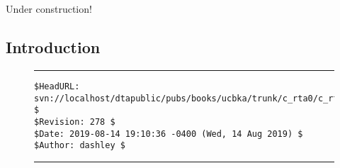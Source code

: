 
\chapter{\crtazerolongtitle{}}

\label{crta0}

                     {Under construction!}

\section{Introduction}



\vfill
\noindent\begin{figure}[!b]
\noindent\rule[-0.25in]{\textwidth}{1pt}
\begin{tiny}
\begin{verbatim}
$HeadURL: svn://localhost/dtapublic/pubs/books/ucbka/trunk/c_rta0/c_rta0.tex $
$Revision: 278 $
$Date: 2019-08-14 19:10:36 -0400 (Wed, 14 Aug 2019) $
$Author: dashley $
\end{verbatim}
\end{tiny}
\noindent\rule[0.25in]{\textwidth}{1pt}
\end{figure}
%
